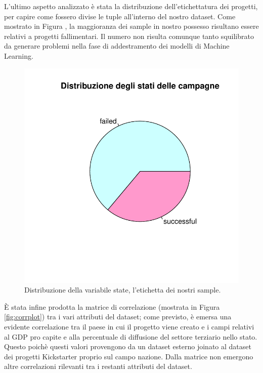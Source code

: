 L'ultimo aspetto analizzato è stata la distribuzione dell'etichettatura dei progetti, per capire come fossero divise le tuple all'interno del nostro dataset. Come mostrato in Figura , la maggioranza dei sample in nostro possesso risultano essere relativi a progetti fallimentari. Il numero non risulta comunque tanto squilibrato da generare problemi nella fase di addestramento dei modelli di Machine Learning.

\begin{figure}
	\centering
	\includegraphics[width=0.8\linewidth]{../FinalResults/Images/Data_exploration_plots/pie_state}
	\caption{Distribuzione della variabile state, l'etichetta dei nostri sample.}
	\label{fig:piestate}
\end{figure}


È stata infine prodotta la matrice di correlazione (mostrata in Figura \ref{fig:corrplot}) tra i vari attributi del dataset; come previsto, è emersa una evidente correlazione tra il paese in cui il progetto viene creato e i campi relativi al GDP pro capite e alla percentuale di diffusione del settore terziario nello stato. Questo poichè questi valori provengono da un dataset esterno joinato al dataset dei progetti Kickstarter proprio sul campo nazione. Dalla matrice non emergono altre correlazioni rilevanti tra i restanti attributi del dataset.

